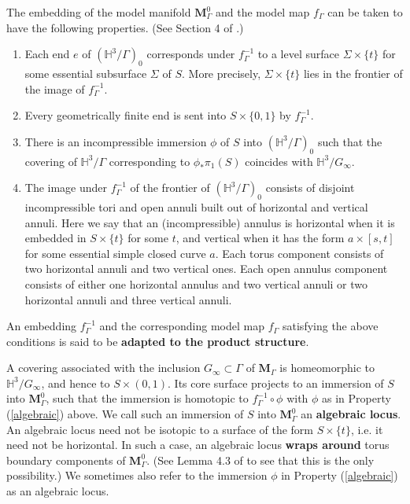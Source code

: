 \documentclass{amsart}
\theoremstyle{definition}
\newcommand\HHH{{\mathbb H}}
\begin{document}
The embedding of the model manifold $\mathbf M_\Gamma^0$ and  the model map $f_\Gamma$ can be taken to have the following properties.
(See Section 4 of \cite{OhD}.)
\begin{enumerate}
\item Each end $e$ of $(\HHH^3/\Gamma)_0$ corresponds under $f_\Gamma^{-1}$ to a level surface $\Sigma \times \{t\}$ for some essential subsurface $\Sigma$ of $S$. 
 More precisely, $\Sigma \times \{t\}$ lies in the frontier of the image of  $f_\Gamma^{-1}$.
\item Every geometrically finite end is sent into $S \times \{0, 1\}$ by $f_\Gamma^{-1}$.
\item
\label{algebraic}
There is an incompressible immersion  $\phi$ of $S$ into $(\HHH^3/\Gamma)_0$ such that the covering of $\HHH^3/\Gamma$ corresponding to $\phi_\ast \pi_1(S)$ coincides with $\HHH^3/G_\infty$. 
\item The image under $f_\Gamma^{-1}$
of the frontier of $(\HHH^3/\Gamma)_0$  consists of disjoint incompressible tori and open annuli built out of horizontal and vertical annuli.
Here we say that an (incompressible) annulus is horizontal when it is embedded in $S \times \{t\}$ for some $t$, and vertical when it has the form $a \times [s,t]$ for some essential simple closed curve $a$.
Each  torus component consists of two horizontal annuli and two vertical ones.
Each open annulus component consists of either one horizontal annulus and two vertical annuli or two horizontal annuli and three vertical annuli.
\end{enumerate}
An embedding $f_\Gamma^{-1}$ and the corresponding model map $f_\Gamma$ satisfying  the above conditions
is said to be {\bf adapted to the product structure}.

A covering associated with  the inclusion $G_\infty \subset \Gamma$ of $\mathbf M_\Gamma$ is homeomorphic to $\HHH^3/G_\infty$, and hence to $S \times (0,1)$.
Its core surface  projects to an immersion of $S$ into $\mathbf M_\Gamma^0$, such that the immersion is homotopic to $f_\Gamma^{-1} \circ \phi$ with $\phi$ as in   Property (\ref{algebraic}) above.
We call such an immersion of $S$ into $\mathbf M_\Gamma^0$ an {\bf algebraic locus}.
An algebraic locus need not be isotopic to a surface of the form $S \times \{t\}$, i.e. it need not be horizontal.
In such a case, an algebraic locus {\bf wraps around} torus boundary components of $\mathbf M_\Gamma^0$.
(See Lemma 4.3 of \cite{OhD} to see that this is the only possibility.)
We sometimes also refer to the immersion $\phi$ in Property (\ref{algebraic}) as an algebraic locus.
\end{document}
